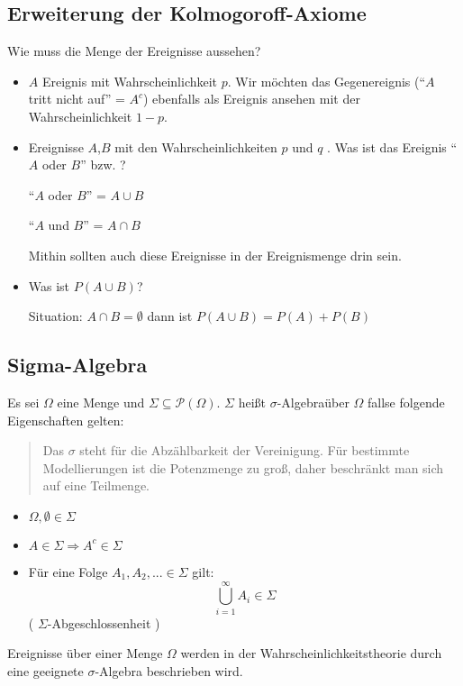 \subsection{Erweiterung der Kolmogoroff-Axiome}

Wie muss die Menge der Ereignisse aussehen?
\begin{itemize}
 \item $A$ Ereignis mit Wahrscheinlichkeit $p$. Wir möchten das Gegenereignis (``$A$ tritt nicht auf'' = $A^c$) ebenfalls als Ereignis ansehen mit der Wahrscheinlichkeit $1-p$.
 \item Ereignisse $A$,$B$ mit den Wahrscheinlichkeiten $p$ und $q$ . Was ist das Ereignis ``$A$ oder $B$'' bzw. ?

 ``$A$ oder $B$'' = $A \cup B$

 ``$A$ und $B$'' = $A \cap B$

 Mithin sollten auch diese Ereignisse in der Ereignismenge drin sein.
 \item Was ist $P(A \cup B)$?

Situation: $A \cap B = \emptyset$ dann ist $P(A \cup B) = P(A) + P(B)$

\end{itemize}
\subsection{Sigma-Algebra}
\begin{definition}
Es sei $\Omega$ eine Menge und $\Sigma \subseteq \mathcal P(\Omega)$. $\Sigma$ heißt $\sigma$-Algebraüber $\Omega$ fallse folgende Eigenschaften gelten:
\end{definition}
\begin{quote}
 Das $\sigma$ steht für die Abzählbarkeit der Vereinigung. Für bestimmte Modellierungen ist die Potenzmenge zu groß, daher beschränkt man sich auf eine Teilmenge.
\end{quote}

\begin{itemize}
 \item $\Omega, \emptyset \in \Sigma$
 \item $A \in \Sigma \Rightarrow A^c \in \Sigma$
 \item Für eine Folge $A_1,A_2,... \in \Sigma$ gilt:
$$ \bigcup_{i=1}^\infty A_i \in \Sigma$$ ( $\Sigma$-Abgeschlossenheit )
\end{itemize}
Ereignisse über einer Menge $\Omega$ werden in der Wahrscheinlichkeitstheorie durch eine geeignete $\sigma$-Algebra beschrieben wird.

